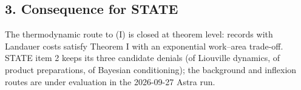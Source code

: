 \documentclass[11pt,a4paper]{article}
\begin{document}
\hypertarget{consequence-for-state}{%
\subsection{3. Consequence for STATE}\label{consequence-for-state}}

The thermodynamic route to (I) is closed at theorem level: records with
Landauer costs satisfy Theorem I with an exponential work--area
trade-off. STATE item 2 keeps its three candidate denials (of Liouville
dynamics, of product preparations, of Bayesian conditioning); the
background and inflexion routes are under evaluation in the 2026-09-27
Astra run.
\end{document}
